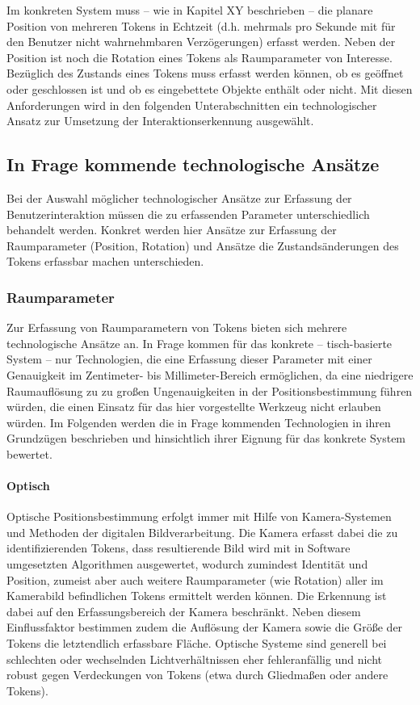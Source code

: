 Im konkreten System muss -- wie in Kapitel XY beschrieben -- die planare Position von mehreren Tokens in Echtzeit (d.h. mehrmals pro Sekunde mit für den Benutzer nicht wahrnehmbaren Verzögerungen) erfasst werden. Neben der Position ist noch die Rotation eines Tokens als Raumparameter von Interesse. Bezüglich des Zustands eines Tokens muss erfasst werden können, ob es geöffnet oder geschlossen ist und ob es eingebettete Objekte enthält oder nicht. Mit diesen Anforderungen wird in den folgenden Unterabschnitten ein technologischer Ansatz zur Umsetzung der Interaktionserkennung ausgewählt.

\subsection{In Frage kommende technologische Ansätze} %
\label{sub:potentielle_technologische_ansätze}
Bei der Auswahl möglicher technologischer Ansätze zur Erfassung der Benutzerinteraktion müssen die zu erfassenden Parameter unterschiedlich behandelt werden. Konkret werden hier Ansätze zur Erfassung der Raumparameter (Position, Rotation) und Ansätze die Zustandsänderungen des Tokens erfassbar machen unterschieden. 

\subsubsection{Raumparameter} %
\label{ssub:raumparameter}
Zur Erfassung von Raumparametern von Tokens bieten sich mehrere technologische Ansätze an. In Frage kommen für das konkrete -- tisch-basierte System -- nur Technologien, die eine Erfassung dieser Parameter mit einer Genauigkeit im Zentimeter- bis Millimeter-Bereich ermöglichen, da eine niedrigere Raumauflösung zu zu großen Ungenauigkeiten in der Positionsbestimmung führen würden, die einen Einsatz für das hier vorgestellte Werkzeug nicht erlauben würden. Im Folgenden werden die in Frage kommenden Technologien in ihren Grundzügen beschrieben und hinsichtlich ihrer Eignung für das konkrete System bewertet.

\paragraph{Optisch} %
\label{par:optisch}

Optische Positionsbestimmung erfolgt immer mit Hilfe von Kamera-Systemen und Methoden der digitalen Bildverarbeitung. Die Kamera erfasst dabei die zu identifizierenden Tokens, dass resultierende Bild wird mit in Software umgesetzten Algorithmen ausgewertet, wodurch zumindest Identität und Position, zumeist aber auch weitere Raumparameter (wie Rotation) aller im Kamerabild befindlichen Tokens ermittelt werden können. Die Erkennung ist dabei auf den Erfassungsbereich der Kamera beschränkt. Neben diesem Einflussfaktor bestimmen zudem die Auflösung der Kamera sowie die Größe der Tokens die letztendlich erfassbare Fläche. Optische Systeme sind generell bei schlechten oder wechselnden Lichtverhältnissen eher fehleranfällig und nicht robust gegen Verdeckungen von Tokens (etwa durch Gliedmaßen oder andere Tokens).

